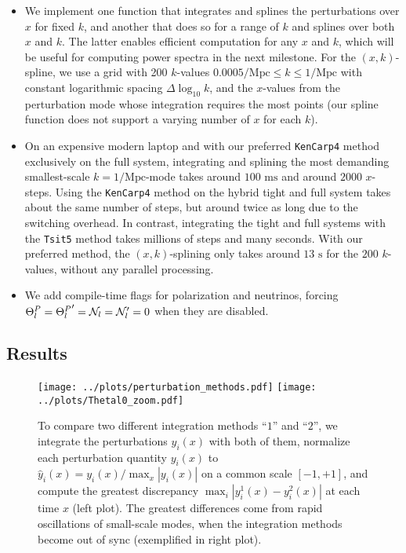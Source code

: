 \documentclass[10pt,a4paper]{article}
\begin{document}
\begin{itemize}
\item
We implement one function that integrates and splines the perturbations over $x$ for fixed $k$,
and another that does so for a range of $k$ and splines over both $x$ and $k$.
The latter enables efficient computation for any $x$ and $k$,
which will be useful for computing power spectra in the next milestone.
For the $(x,k)$-spline,
we use a grid with 200 $k$-values $0.0005 / \textrm{Mpc} \leq k \leq 1 / \textrm{Mpc}$ with constant logarithmic spacing $\Delta \log_{10} k$,
and the $x$-values from the perturbation mode whose integration requires the most points (our spline function does not support a varying number of $x$ for each $k$).

\item
On an expensive modern laptop and with our preferred \texttt{KenCarp4} method exclusively on the full system,
integrating and splining the most demanding smallest-scale $k=1/\textrm{Mpc}$-mode
takes around $100 \textrm{ ms}$ and around $2000$ $x$-steps.
Using the \texttt{KenCarp4} method on the hybrid tight and full system takes about the same number of steps,
but around twice as long due to the switching overhead.
In contrast, integrating the tight and full systems with the \texttt{Tsit5} method takes millions of steps and many seconds.
With our preferred method, the $(x,k)$-splining only takes around $13 \textrm{ s}$ for the $200$ $k$-values, without any parallel processing.

\item
We add compile-time flags for polarization and neutrinos,
forcing $\Theta^P_l = {\Theta^P_l}^\prime = \mathcal{N}_l = \mathcal{N}_l^\prime = 0$ when they are disabled.
\end{itemize}

\subsection{Results}

\begin{figure}
\texttt{[image: ../plots/perturbation\_methods.pdf]}
\hfill
\texttt{[image: ../plots/Thetal0\_zoom.pdf]}
\caption{To compare two different integration methods ``$1$'' and ``$2$'',
we integrate the perturbations $y_i(x)$ with both of them,
normalize each perturbation quantity $y_i(x)$ to $\hat{y}_i(x) = y_i(x) / \max_x |y_i(x)|$ on a common scale $[-1, +1]$,
and compute the greatest discrepancy $\max_i |y^1_i(x) - y^2_i(x)|$ at each time $x$ (left plot).
The greatest differences come from rapid oscillations of small-scale modes, when the integration methods become out of sync (exemplified in right plot).}
\label{fig_perturb_methods}
\end{figure}
\end{document}

